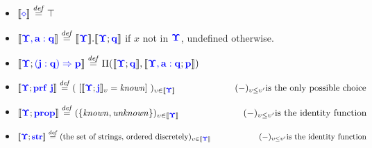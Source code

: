 \documentclass{article}
\newcommand{\blu}[1]{\mathbf{\color{blue}{#1}}}
\newcommand{\sem}[1]{\llbracket #1 \rrbracket}
\newcommand{\defeq}{\overset{\mathit{def}}{=}}
\begin{document}
\begin{itemize}
\item $\sem{\blu{\diamond}} \defeq \top$
\item $\sem{\blu{\Upsilon,a:q}} \defeq \sem{\blu{\Upsilon}}.\sem{\blu{\Upsilon};\blu{q}}$ if $x$ not in $\blu{\Upsilon}$, undefined otherwise.
\item $\sem{\blu{\Upsilon}; \blu{(j : q) \Rightarrow p}} \defeq \Pi(\sem{\blu{\Upsilon};\blu{q}},\sem{\blu{\Upsilon,a:q};\blu{p}})$
\item $\sem{\blu{\Upsilon}; \blu{\mathbf{prf}~j}} \defeq (~[ \sem{\blu{\Upsilon}; \blu{j}}_\upsilon = \mathit{known} ]~)_{\upsilon \in \sem{\blu{\Upsilon}}}\\ ~~~~~~~~~~~~~~~~~~~~(-)_{\upsilon \leq \upsilon'} \text{is the only possible choice}$
\item $\sem{\blu{\Upsilon}; \blu{prop}} \defeq ( \{ \mathit{known}, \mathit{unknown} \} )_{\upsilon \in \sem{\blu{\Upsilon}}}  \\ ~~~~~~~~~~~~~~~~~~~~~(-)_{\upsilon \leq \upsilon'} \text{is the identity function}$
\item $\sem{\blu{\Upsilon}; \blu{str}} \defeq (\text{the set of strings, ordered discretely})_{\upsilon \in \sem{\blu{\Upsilon}}} \\ ~~~~~~~~~~~~~~~~~~(-)_{\upsilon \leq \upsilon'} \text{is the identity function}$
\end{itemize}
\end{document}
